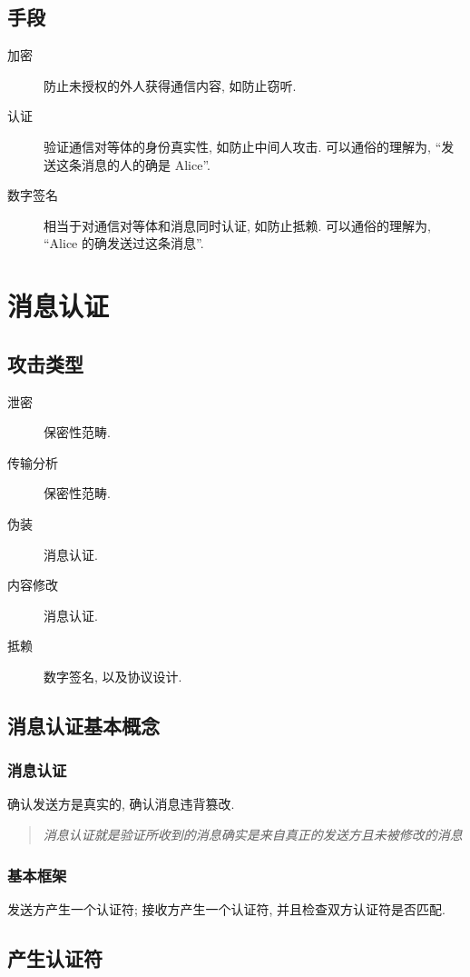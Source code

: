 \documentclass{ctexart}
\begin{document}
\subsection{手段}
    \begin{description}
        \item[加密] 防止未授权的外人获得通信内容, 如防止窃听.
        \item[认证] 验证通信对等体的身份真实性, 如防止中间人攻击. 可以通俗的理解为, ``发送这条消息的人的确是 Alice''.
        \item[数字签名] 相当于对通信对等体和消息同时认证, 如防止抵赖. 可以通俗的理解为, ``Alice 的确发送过这条消息''.
    \end{description}

\section{消息认证}
\subsection{攻击类型}
    \begin{description}
        \item[泄密] 保密性范畴.
        \item[传输分析] 保密性范畴.
        \item[伪装] 消息认证.
        \item[内容修改] 消息认证.
        \item[抵赖] 数字签名, 以及协议设计.
    \end{description}
\subsection{消息认证基本概念}
\subsubsection{消息认证} 确认发送方是真实的, 确认消息违背篡改.
    \begin{quote}{\itshape 消息认证就是验证所收到的消息确实是来自真正的发送方且未被修改的消息}\end{quote}
\subsubsection{基本框架} 发送方产生一个认证符; 接收方产生一个认证符, 并且检查双方认证符是否匹配.

\subsection{产生认证符}
\end{document}
